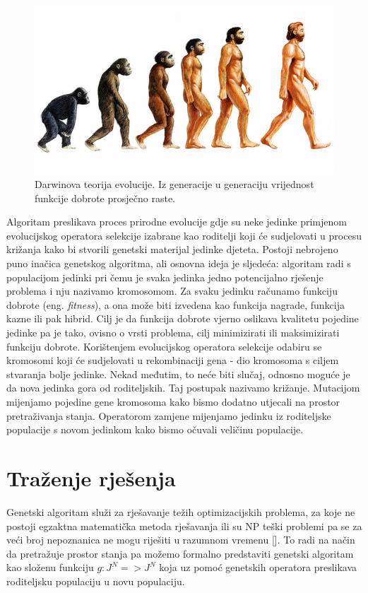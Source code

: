\documentclass[times, utf8, zavrsni]{fer}
\begin{document}
\begin{figure}[!htb]
	\centering
	\includegraphics[width=15cm]{slike/darwin.jpg}
	\caption{Darwinova teorija evolucije. Iz generacije u generaciju vrijednost funkcije dobrote prosječno raste. }
	\label{fig:darwin}
\end{figure}

Algoritam preslikava proces prirodne evolucije gdje su neke jedinke primjenom evolucijskog operatora selekcije izabrane kao roditelji koji će sudjelovati u procesu križanja kako bi stvorili genetski materijal jedinke djeteta. Postoji nebrojeno puno inačica genetskog algoritma, ali osnovna ideja je sljedeća: algoritam radi s populacijom jedinki pri čemu je svaka jedinka jedno potencijalno rješenje problema i nju nazivamo kromosomom. Za svaku jedinku računamo  funkciju dobrote (eng. \emph{fitness}), a ona može biti izvedena kao funkcija nagrade, funkcija kazne ili pak hibrid. Cilj je da funkcija dobrote vjerno oslikava kvalitetu pojedine jedinke pa je tako, ovisno o vrsti problema, cilj minimizirati ili maksimizirati funkciju dobrote. Korištenjem evolucijskog operatora selekcije odabiru se kromosomi koji će sudjelovati u rekombinaciji gena - dio kromosoma s ciljem stvaranja bolje jedinke. Nekad međutim, to neće biti slučaj, odnosno moguće je da nova jedinka gora od roditeljskih. Taj postupak nazivamo križanje. Mutacijom mijenjamo pojedine gene kromosoma kako bismo dodatno utjecali na prostor pretraživanja stanja. Operatorom zamjene mijenjamo jedinku iz roditeljske populacije s novom jedinkom kako bismo očuvali veličinu populacije. 

\section{Traženje rješenja}

Genetski algoritam služi za rješavanje težih optimizacijskih problema, za koje ne postoji egzaktna matematička metoda rješavanja ili su NP teški problemi pa se za veći broj nepoznanica ne mogu riješiti u razumnom vremenu [\citep{NENR}]. To radi na način da pretražuje prostor stanja pa možemo formalno predstaviti genetski algoritam kao složenu funkciju $g : J^N$$=>$$J^N$ koja uz pomoć genetskih operatora preslikava roditeljsku populaciju u novu populaciju. 
\end{document}
